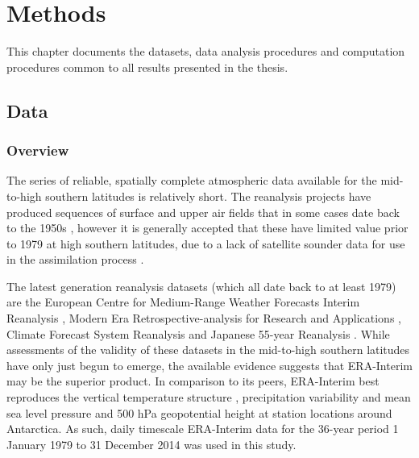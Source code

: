 
\chapter{Methods}\label{c:methods}


\begin{synopsis}

This chapter documents the datasets, data analysis procedures and computation procedures common to all results presented in the thesis.

\end{synopsis}

\section{Data}\label{s:data}


\subsection{Overview}

The series of reliable, spatially complete atmospheric data available for the mid-to-high southern latitudes is relatively short. The reanalysis projects have produced sequences of surface and upper air fields that in some cases date back to the 1950s \citep{Kistler2001,Uppala2005,Kobayashi2015}, however it is generally accepted that these have limited value prior to 1979 at high southern latitudes, due to a lack of satellite sounder data for use in the assimilation process \citep{Hines2000}.

The latest generation reanalysis datasets (which all date back to at least 1979) are the European Centre for Medium-Range Weather Forecasts Interim Reanalysis \citep[ERA-Interim;][]{Dee2011}, Modern Era Retrospective-analysis for Research and Applications \citep[Merra;][]{Rienecker2011}, Climate Forecast System Reanalysis \citep[CFSR;][]{Saha2010} and Japanese 55-year Reanalysis \citep[JRA-55;][]{Kobayashi2015}. While assessments of the validity of these datasets in the mid-to-high southern latitudes have only just begun to emerge, the available evidence suggests that ERA-Interim may be the superior product. In comparison to its peers, ERA-Interim best reproduces the vertical temperature structure \citep{Screen2012}, precipitation variability \citep{Bromwich2011,Nicolas2011} and mean sea level pressure and 500 hPa geopotential height at station locations \citep{Bracegirdle2012} around Antarctica. As such, daily timescale ERA-Interim data for the 36-year period 1 January 1979 to 31 December 2014 was used in this study.


